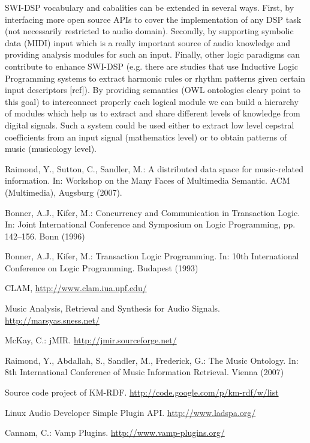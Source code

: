 \documentclass[runningheads]{llncs}
\begin{document}
SWI-DSP vocabulary and cabalities can be extended in several ways. First, by interfacing more open source APIs to cover the implementation of any DSP task (not necessarily restricted to audio domain). Secondly, by supporting symbolic data (MIDI) input which is a really important source of audio knowledge and providing analysis modules for such an input. Finally, other logic paradigms can contribute to enhance SWI-DSP (e.g. there are studies that use Inductive Logic Programming systems to extract harmonic rules or rhythm patterns given certain input descriptors [ref]). By providing semantics (OWL ontologies cleary point to this goal) to interconnect properly each logical module we can build a hierarchy of modules which help us to extract and share different levels of knowledge from digital signals. Such a system could be used either to extract low level cepstral coefficients from an input signal (mathematics level) or to obtain patterns of music (musicology level).

\begin{thebibliography}{4}

 Raimond, Y., Sutton, C., Sandler, M.: A distributed data space for music-related information. In: Workshop on the Many Faces of Multimedia Semantic. ACM (Multimedia), Augsburg (2007).

 Bonner, A.J., Kifer, M.: Concurrency and Communication in Transaction Logic. In: Joint International Conference and Symposium on Logic Programming, pp. 142--156. Bonn (1996)

 Bonner, A.J., Kifer, M.: Transaction Logic Programming. In: 10th International Conference on Logic Programming. Budapest (1993)

 CLAM, \url{http://www.clam.iua.upf.edu/}

 Music Analysis, Retrieval and Synthesis for Audio Signals. \url{http://marsyas.sness.net/}

 McKay, C.: jMIR. \url{http://jmir.sourceforge.net/}

 Raimond, Y., Abdallah, S., Sandler, M., Frederick, G.: The Music Ontology. In: 8th International Conference of Music Information Retrieval. Vienna (2007)

 Source code project of KM-RDF. \url{http://code.google.com/p/km-rdf/w/list}

 Linux Audio Developer Simple Plugin API. \url{http://www.ladspa.org/}

 Cannam, C.: Vamp Plugins. \url{http://www.vamp-plugins.org/}

\end{thebibliography}
\end{document}
